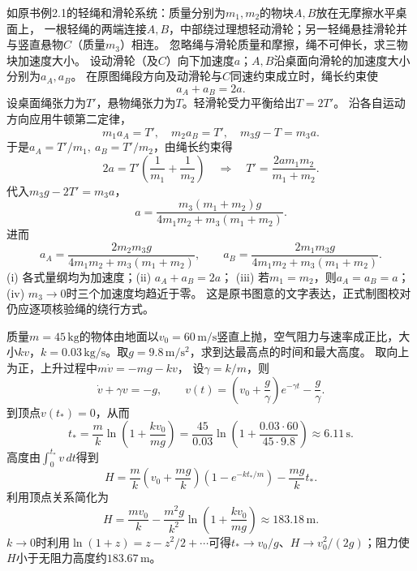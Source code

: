 

\problemtext 如原书例2.1的轻绳和滑轮系统：质量分别为$m_1,m_2$的物块$A,B$放在无摩擦水平桌面上，
一根轻绳的两端连接$A,B$，中部绕过理想轻动滑轮；另一轻绳悬挂滑轮并与竖直悬物$C$（质量$m_3$）相连。
忽略绳与滑轮质量和摩擦，绳不可伸长，求三物块加速度大小。
\workings
设动滑轮（及$C$）向下加速度$a$；$A,B$沿桌面向滑轮的加速度大小分别为$a_A,a_B$。
在原图绳段方向及动滑轮与$C$同速约束成立时，绳长约束使
\[
a_A+a_B=2a.
\]
设桌面绳张力为$T'$，悬物绳张力为$T$。轻滑轮受力平衡给出$T=2T'$。
沿各自运动方向应用牛顿第二定律，
\[
m_1a_A=T',\quad m_2a_B=T',\quad m_3g-T=m_3a.
\]
于是$a_A=T'/m_1,\ a_B=T'/m_2$，由绳长约束得
\[
2a=T'\left(\frac1{m_1}+\frac1{m_2}\right)
\quad\Longrightarrow\quad
T'=\frac{2am_1m_2}{m_1+m_2}.
\]
代入$m_3g-2T'=m_3a$，
\[
\boxed{
a=\frac{m_3(m_1+m_2)g}{4m_1m_2+m_3(m_1+m_2)}
}.
\]
进而
\[
\boxed{
a_A=\frac{2m_2m_3g}{4m_1m_2+m_3(m_1+m_2)},\qquad
a_B=\frac{2m_1m_3g}{4m_1m_2+m_3(m_1+m_2)}.
}
\]
\crosscheck (i) 各式量纲均为加速度；(ii) $a_A+a_B=2a$；
(iii) 若$m_1=m_2$，则$a_A=a_B=a$；
(iv) $m_3\to0$时三个加速度均趋近于零。
这是原书图意的文字表达，正式制图校对仍应逐项核验绳的绕行方式。



\problemtext 质量$m=45\,\mathrm{kg}$的物体由地面以$v_0=60\,\mathrm{m/s}$竖直上抛，空气阻力与速率成正比，大小$kv$，$k=0.03\,\mathrm{kg/s}$。取$g=9.8\,\mathrm{m/s^2}$，求到达最高点的时间和最大高度。
\workings
取向上为正，上升过程中$m\dot v=-mg-kv$，
设$\gamma=k/m$，则
\[
\dot v+\gamma v=-g,\qquad
v(t)=\left(v_0+\frac g\gamma\right)e^{-\gamma t}-\frac g\gamma.
\]
到顶点$v(t_*)=0$，从而
\[
\boxed{t_*=\frac{m}{k}\ln\left(1+\frac{kv_0}{mg}\right)
=\frac{45}{0.03}\ln\left(1+\frac{0.03\cdot60}{45\cdot9.8}\right)
\approx6.11\,\mathrm s}.
\]
高度由$\int_0^{t_*}v\,dt$得到
\[
H=\frac{m}{k}\left(v_0+\frac{mg}{k}\right)
       (1-e^{-kt_*/m})-\frac{mg}{k}t_*.
\]
利用顶点关系简化为
\[
\boxed{H=\frac{mv_0}{k}-\frac{m^2g}{k^2}
        \ln\left(1+\frac{kv_0}{mg}\right)
\approx 183.18\,\mathrm m}.
\]
\crosscheck $k\to0$时利用$\ln(1+z)=z-z^2/2+\cdots$可得$t_*\to v_0/g$、$H\to v_0^2/(2g)$；阻力使$H$小于无阻力高度约$183.67\,\mathrm m$。

